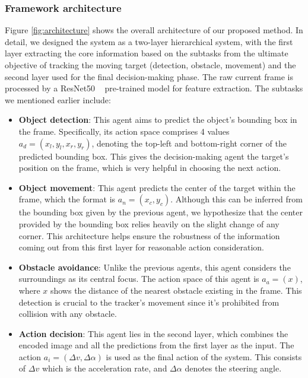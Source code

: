 \documentclass[sigconf]{aamas}
\begin{document}
\subsubsection{Framework architecture}
Figure \ref{fig:architecture} shows the overall architecture of our proposed method. In detail, we designed the system as a two-layer hierarchical system, with the first layer extracting the core information based on the subtasks from the ultimate objective of tracking the moving target (detection, obstacle, movement) and the second layer used for the final decision-making phase. The raw current frame is processed by a ResNet50 ~\cite{he2015deepresiduallearningimage} pre-trained model for feature extraction. The subtasks we mentioned earlier include:

\begin{itemize}
\item \textbf{Object detection}: This agent aims to predict the object's bounding box in the frame. Specifically, its action space comprises 4 values \(a_d = (x_l, y_l, x_r, y_r)\), denoting the top-left and bottom-right corner of the predicted bounding box. This gives the decision-making agent the target's position on the frame, which is very helpful in choosing the next action.
\item \textbf{Object movement}: This agent predicts the center of the target within the frame, which the format is \(a_n = (x_c, y_c)\). Although this can be inferred from the bounding box given by the previous agent, we hypothesize that the center provided by the bounding box relies heavily on the slight change of any corner. This architecture helps ensure the robustness of the information coming out from this first layer for reasonable action consideration. 
\item \textbf{Obstacle avoidance}: Unlike the previous agents, this agent considers the surroundings as its central focus. The action space of this agent is \(a_a = (x)\), where \(x\) shows the distance of the nearest obstacle existing in the frame. This detection is crucial to the tracker's movement since it's prohibited from collision with any obstacle.
\item \textbf{Action decision}: This agent lies in the second layer, which combines the encoded image and all the predictions from the first layer as the input. The action \(a_i = (\Delta v, \Delta \alpha)\) is used as the final action of the system. This consists of \(\Delta v\) which is the acceleration rate, and \(\Delta \alpha\) denotes the steering angle.
\end{itemize}
\end{document}
